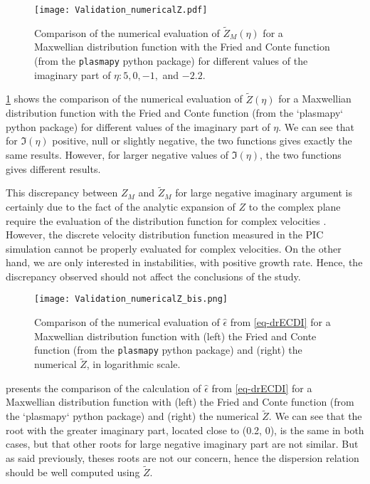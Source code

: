   \begin{figure}[!hbt]
    \centering
    \texttt{[image: Validation\_numericalZ.pdf]}
    \caption{Comparison of the numerical evaluation of $\tilde{Z}_M(\eta)$ for a Maxwellian distribution function with the Fried and Conte function (from the \texttt{plasmapy} python package) for different values of the imaginary part of $\eta: 5, 0,-1,$ and $-2.2$.  }
    \label{fig-numZ}
  \end{figure}
  \cref{fig-numZ} shows the comparison of the numerical evaluation of $\tilde{Z}(\eta)$ for a Maxwellian distribution function with the Fried and Conte function (from the `plasmapy` python package) for different values of the imaginary part of $\eta$.
  We can see that for $\Im(\eta)$ positive, null or slightly negative, the two functions gives exactly the same results.
  However, for larger negative values of $\Im(\eta)$, the two functions gives different results.
  
  This discrepancy between $Z_M$ and $\tilde{Z}_M$ for large negative imaginary argument is certainly due to the fact of the analytic expansion of $Z$ to the complex plane require the evaluation of the distribution function for complex velocities \citep{xie2013,weideman1995}.
  However, the discrete velocity distribution function measured in the \ac{PIC} simulation cannot be properly evaluated for complex velocities.
  On the other hand, we are only interested in instabilities, with positive growth rate.
  Hence, the discrepancy observed should not affect the conclusions of the study.
  


  \begin{figure}[hbt]
    \centering
    \texttt{[image: Validation\_numericalZ\_bis.png]}
    \caption{Comparison of the numerical evaluation of $\hat\epsilon$ from \cref{eq-drECDI} for a Maxwellian distribution function with (left) the Fried and Conte function (from the \texttt{plasmapy} python package) and (right) the numerical $\tilde{Z}$, in logarithmic scale.  }
    \label{fig-numZbis}
  \end{figure}
  
   presents the comparison of the calculation of $\hat\epsilon$ from \cref{eq-drECDI} for a Maxwellian distribution function with (left) the Fried and Conte function (from the `plasmapy` python package) and (right) the numerical $\tilde{Z}$.
  We can see that the root with the greater imaginary part, located close to (0.2, 0), is the same in both cases, but that other roots for large negative imaginary part are not similar.
  But as said previously, theses roots are not our concern, hence the dispersion relation should be well computed using $\tilde{Z}$.
  


